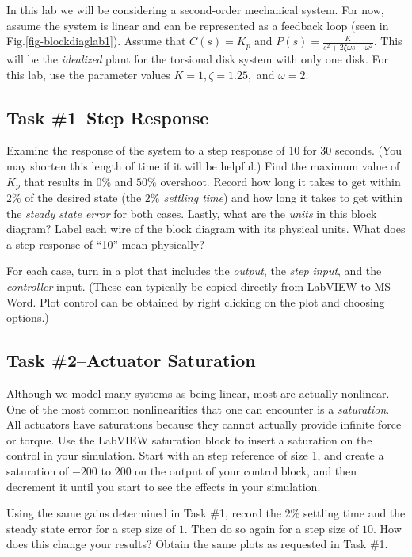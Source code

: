 In this lab we will be considering a second-order mechanical system.  For now,
assume the system is linear and can be represented as a feedback loop (seen in
Fig.\ref{fig-blockdiaglab1}).  Assume that $C(s)=K_p$ and
$P(s)=\frac{K}{s^2+2\zeta\omega s+\omega^2}$.  This will be the \emph{idealized} plant for
the torsional disk system with only one disk.  For this lab, use the parameter
values $K=1, \zeta=1.25,$ and $\omega=2$.


\subsection{Task \#1--Step Response}

Examine the response of the system to a step response of 10 for 30 seconds.
(You may shorten this length of time if it will be helpful.)  Find the maximum
value of $K_p$ that results in $0\%$ and $50\%$ overshoot.  Record how long it
takes to get within $2\%$ of the desired state (the \emph{$2\%$ settling time})
and how long it takes to get within the \emph{steady state error} for both
cases.  Lastly, what are the \emph{units} in this block diagram?  Label each
wire of the block diagram with its physical units.  What does a step response of
``10'' mean physically?

For each case, turn in a plot that includes the \emph{output}, the \emph{step
  input}, and the \emph{controller} input.  (These can typically be copied
directly from LabVIEW to MS Word.  Plot control can be obtained by right
clicking on the plot and choosing options.)

\subsection{Task \#2--Actuator Saturation}

Although we model many systems as being linear, most are actually nonlinear.
One of the most common nonlinearities that one can encounter is a
\emph{saturation}.  All actuators have saturations because they cannot actually
provide infinite force or torque.  Use the LabVIEW saturation block to insert a
saturation on the control in your simulation.  Start with an step reference of
size 1, and create a saturation of $-200$ to $200$ on the output of your control
block, and then decrement it until you start to see the effects in your
simulation.

Using the same gains determined in Task \#1, record the $2\%$ settling time and
the steady state error for a step size of $1$.  Then do so again for a step size
of $10$.  How does this change your results?  Obtain the same plots as requested
in Task \#1.  

